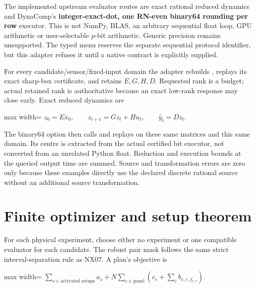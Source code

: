 \documentclass[
  11pt,
  a4paper,
]{report}
\let\singularitytexttt\texttt
\renewcommand{\texttt}[1]{\singularitytexttt{\seqsplit{#1}}}
\begin{document}
The implemented upstream evaluator routes are exact rational reduced
dynamics and DynaComp's \textbf{integer-exact-dot, one RN-even binary64
rounding per row} executor. This is not NumPy, BLAS, an arbitrary
sequential float loop, GPU arithmetic or user-selectable \(p\)-bit
arithmetic. Generic precision remains unsupported. The typed menu
reserves the separate sequential protocol identifier, but this adapter
refuses it until a native contract is explicitly supplied.

For every candidate/sensor/fixed-input domain the adapter rebuilds
\texttt{uniform\_enrichment}, replays its exact sharp-box certificate,
and retains \(E,G,H,D\). Requested rank is a budget; actual retained
rank is authoritative because an exact low-rank response may close
early. Exact reduced dynamics are

\begin{center}
\begin{adjustbox}{max width=\linewidth}
$\displaystyle
z_0=Ex_0,\qquad z_{t+1}=Gz_t+Hu_t,\qquad \widehat y_t=Dz_t.
$
\end{adjustbox}
\end{center}

The binary64 option then calls and replays \texttt{certify\_execution}
on these same matrices and this same domain. Its centre is extracted
from the actual certified bit executor, not converted from an unrelated
Python float. Reduction and execution bounds at the queried output time
are summed. Source and transformation errors are zero only because these
examples directly use the declared discrete rational source without an
additional source transformation.

\hypertarget{finite-optimizer-and-setup-theorem}{%
\section{Finite optimizer and setup
theorem}\label{finite-optimizer-and-setup-theorem}}

For each physical experiment, choose either no experiment or one
compatible evaluator for each candidate. The robust pair mask follows
the same strict interval-separation rule as NX07. A plan's objective is

\begin{center}
\begin{adjustbox}{max width=\linewidth}
$\displaystyle
\sum_{s\in\text{activated setups}}a_s+
N\sum_{e\in\text{panel}}\left(c_e+\sum_c b_{e,c,f_{e,c}}\right).
$
\end{adjustbox}
\end{center}
\end{document}
